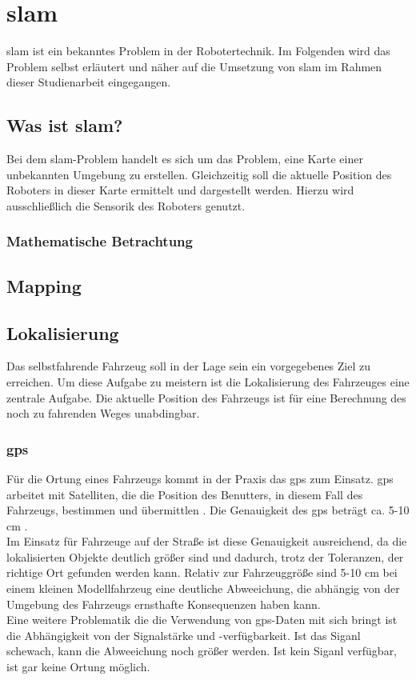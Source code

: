 \section{\acf{slam}}
\ac{slam} ist ein bekanntes Problem in der Robotertechnik. 
Im Folgenden wird das Problem selbst erläutert und näher auf die Umsetzung von \ac{slam} im Rahmen dieser Studienarbeit eingegangen.

\subsection{Was ist \ac{slam}?}
Bei dem \ac{slam}-Problem handelt es sich um das Problem, eine Karte einer unbekannten Umgebung zu erstellen.
Gleichzeitig soll die aktuelle Position des Roboters in dieser Karte ermittelt und dargestellt werden.
Hierzu wird ausschließlich die Sensorik des Roboters genutzt.

\subsubsection{Mathematische Betrachtung}


\subsection{Mapping}

\subsection{Lokalisierung}
Das selbstfahrende Fahrzeug soll in der Lage sein ein vorgegebenes Ziel zu erreichen. 
Um diese Aufgabe zu meistern ist die Lokalisierung des Fahrzeuges eine zentrale Aufgabe. 
Die aktuelle Position des Fahrzeugs ist für eine Berechnung des noch zu fahrenden Weges unabdingbar.

\subsubsection{\acf{gps}}
Für die Ortung eines Fahrzeugs kommt in der Praxis das \ac{gps} zum Einsatz. \ac{gps} arbeitet mit Satelliten, die die Position des Benutters, in diesem Fall des Fahrzeugs, bestimmen
und übermittlen \cite{ashby2003relativity}. Die Genauigkeit des \ac{gps} beträgt ca. 5-10 cm \cite{ashby2003relativity}. \\
Im Einsatz für Fahrzeuge auf der Straße ist diese Genauigkeit ausreichend, da die lokalisierten Objekte deutlich größer sind und dadurch, trotz der Toleranzen, der richtige Ort gefunden werden kann.
Relativ zur Fahrzeuggröße sind 5-10 cm bei einem kleinen Modellfahrzeug eine deutliche Abweeichung, die abhängig von der Umgebung des Fahrzeugs ernsthafte Konsequenzen haben kann. \\
Eine weitere Problematik die die Verwendung von \ac{gps}-Daten mit sich bringt ist die Abhängigkeit von der Signalstärke und -verfügbarkeit. Ist das Siganl schewach, kann die Abweeichung noch größer werden. Ist kein Siganl
verfügbar, ist gar keine Ortung möglich.

